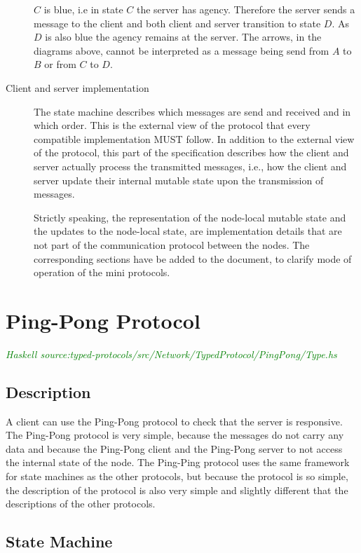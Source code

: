 \documentclass{report}
\newcommand{\hsref}[1]{{\textcolor{green}{\emph{Haskell source:#1}}}}
\newcommand{\msg}[1]{\texttt{#1}}
\theoremstyle{definition}{
  \newtheorem{lemma}{Lemma}[section] %
  \newtheorem{definition}[lemma]{Definition}
}
\theoremstyle{theorem}{
  \newtheorem{invariant}[lemma]{Invariant}
  \newtheorem{proofobligation}[lemma]{Proof Obligation}
}
\numberwithin{equation}{lemma}
\begin{document}
\begin{description}
      $C$ is blue, i.e in state $C$ the server has agency.
      Therefore the server sends a message to the client and
      both client and server transition to state $D$.
      As $D$ is also blue the agency remains at the server.
      The arrows, in the diagrams above,
      cannot be interpreted as a message being send from $A$ to $B$ or from $C$ to $D$.

\item[Client and server implementation]
  The state machine describes which messages are send and received and in which order.
  This is the external view of the protocol that every compatible implementation MUST follow.
  In addition to the external view of the protocol, this part of the specification describes
  how the client and server actually process the transmitted messages,
  i.e., how the client and server update their internal mutable state
  upon the transmission of messages.

  Strictly speaking, the representation of the node-local mutable state
  and the updates to the node-local state, are implementation details that are
  not part of the communication protocol between the nodes.
  The corresponding sections have be added to the document,
  to clarify mode of operation of the mini protocols.

\end{description}

\section{Ping-Pong Protocol}
\label{ping-pong-protocol}
\hsref{typed-protocols/src/Network/TypedProtocol/PingPong/Type.hs}
\newcommand{\Ping}{\msg{Ping}}
\newcommand{\Pong}{\msg{Pong}}

\subsection{Description}
A client can use the Ping-Pong protocol to check that the server is responsive.
The Ping-Pong protocol is very simple, because the messages do not carry any data and
because the Ping-Pong client and the Ping-Pong server to not access the internal state of the node.
The Ping-Ping protocol uses the same framework for state machines as the other protocols,
but because the protocol is so simple, the description of the protocol is also very simple and slightly
different that the descriptions of the other protocols.

\subsection{State Machine}
\end{document}

